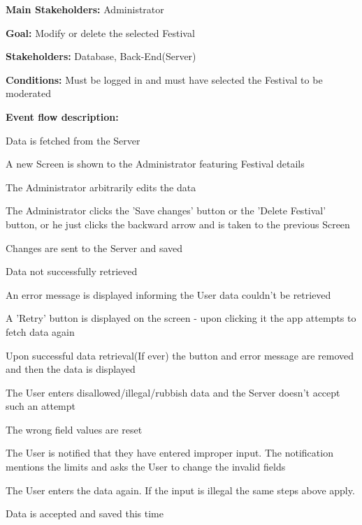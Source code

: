 				\noindent {}
				\begin{packed_item}
					\item \textbf{Main Stakeholders:} Administrator
					\item \textbf{Goal:} Modify or delete the selected Festival
					\item \textbf{Stakeholders: } Database, Back-End(Server)
					\item \textbf{Conditions: } Must be logged in and must have selected the Festival to be moderated
					\item \textbf{Event flow description: }
					\begin{packed_enum}
						\item Data is fetched from the Server
						\item A new Screen is shown to the Administrator featuring Festival details
						\item The Administrator arbitrarily edits the data
						\item The Administrator clicks the 'Save changes' button or the 'Delete Festival' button, or he just clicks the backward arrow and is taken to the previous Screen
						\item Changes are sent to the Server and saved
					\end{packed_enum}
					
					\begin{packed_item}
						\item[1.a] Data not successfully retrieved
						\item[] \begin{packed_enum}
							\item An error message is displayed informing the User data couldn't be retrieved
							\item A 'Retry' button is displayed on the screen - upon clicking it the app attempts to fetch data again
							\item Upon successful data retrieval(If ever) the button and error message are removed and then the data is displayed
						\end{packed_enum}
					
						\item[3.a] The User enters disallowed/illegal/rubbish data and the Server doesn't accept such an attempt
						\item[] \begin{packed_enum}
							\item The wrong field values are reset
							\item The User is notified that they have entered improper input. The notification mentions the limits and asks the User to change the invalid fields
							\item The User enters the data again. If the input is illegal the same steps above apply.
							\item Data is accepted and saved this time
						\end{packed_enum}
					\end{packed_item}
				\end{packed_item}	
			
